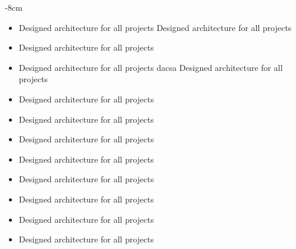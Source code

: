 \documentclass[10pt,a4paper]{altacv}
\begin{document}

\begin{adjustwidth}{}{-8cm}
\makecvheader
\end{adjustwidth}


\begin{itemize}
	\item Designed architecture for all projects Designed architecture for all projects
	\item Designed architecture for all projects
	\item Designed architecture for all projects dacsa Designed architecture for all projects
	\item Designed architecture for all projects
	\item Designed architecture for all projects
	\item Designed architecture for all projects
\end{itemize}

\divider

\begin{itemize}
	\item Designed architecture for all projects
	\item Designed architecture for all projects
	\item Designed architecture for all projects
	\item Designed architecture for all projects
	\item Designed architecture for all projects
\end{itemize}
\end{document}

